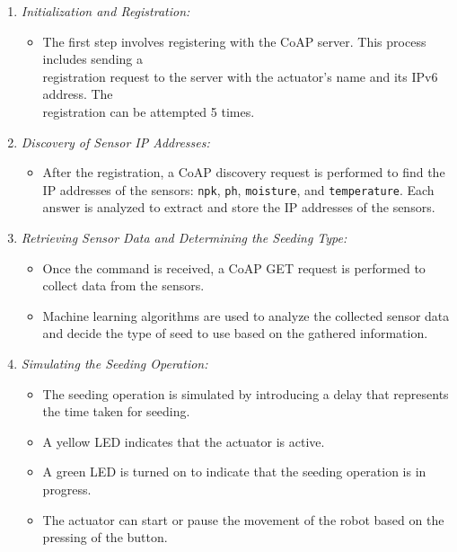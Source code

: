 \begin{enumerate}
    \item \textit{Initialization and Registration:}
    \begin{itemize}
        \item The first step involves registering with the CoAP server. This process includes sending a\\
         registration request to the server with the actuator's name and its IPv6 address. The\\
         registration can be attempted 5 times.
    \end{itemize}
    
    \item \textit{Discovery of Sensor IP Addresses:}
    \begin{itemize}
        \item After the registration, a CoAP discovery request is performed to find the IP addresses of the sensors: \texttt{npk}, \texttt{ph}, \texttt{moisture}, and \texttt{temperature}. Each answer is analyzed to extract and store the IP addresses of the sensors.
    \end{itemize}
    
    \item \textit{Retrieving Sensor Data and Determining the Seeding Type:}
    \begin{itemize}
        \item Once the command is received, a CoAP GET request is performed to collect data from the sensors.
        \item Machine learning algorithms are used to analyze the collected sensor data and decide the type of seed to use based on the gathered information.
    \end{itemize}
    
    \item \textit{Simulating the Seeding Operation:}
    \begin{itemize}
        \item The seeding operation is simulated by introducing a delay that represents the time taken for seeding.
        \item A yellow LED indicates that the actuator is active.
        \item A green LED is turned on to indicate that the seeding operation is in progress.
        \item The actuator can start or pause the movement of the robot based on the pressing of the button.
    \end{itemize}
    

\end{enumerate}
